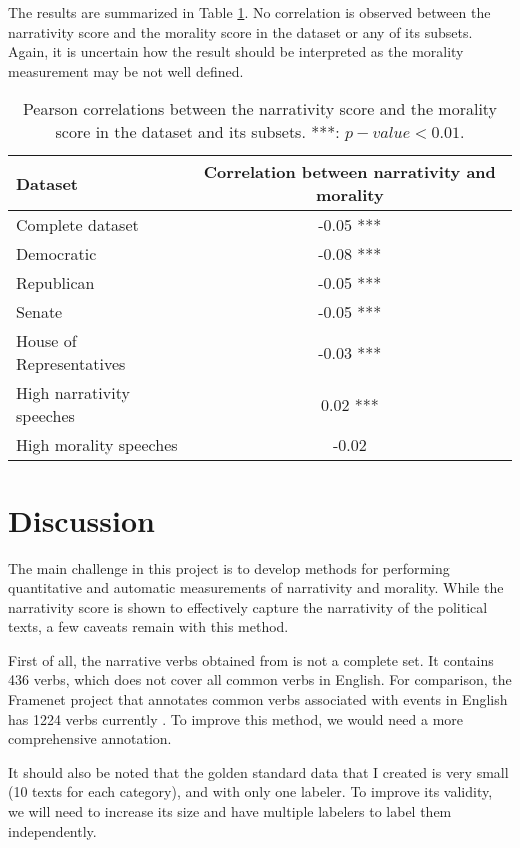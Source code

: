 \documentclass[a4paper]{article}
\begin{document}
The results are summarized in Table \ref{tab:correlations}. No correlation is observed between the narrativity score and the morality score in the dataset or any of its subsets. Again, it is uncertain how the result should be interpreted as the morality measurement may be not well defined.

\begin{table}
\centering
\begin{tabular}{l|c}
\toprule
Dataset & Correlation between narrativity and morality \\\hline
Complete dataset &  -0.05 ***\\
Democratic & -0.08 ***\\
Republican & -0.05 *** \\
Senate & -0.05 *** \\
House of Representatives & -0.03 ***\\
High narrativity speeches & 0.02 ***\\
High morality speeches & -0.02   \\
\bottomrule
\end{tabular}
\caption{\label{tab:correlations} Pearson correlations between the narrativity score and the morality score in the dataset and its subsets. ***: $p-value < 0.01$. }
\end{table}

\section*{Discussion}
The main challenge in this project is to develop methods for performing quantitative and automatic measurements of narrativity and morality. While the narrativity score is shown to effectively capture the narrativity of the political texts, a few caveats remain with this method.

First of all, the narrative verbs obtained from \cite{grisot2014cross} is not a complete set. It contains 436 verbs, which does not cover all common verbs in English. For comparison, the Framenet project that annotates common verbs associated with events in English has 1224 verbs currently \cite{framenetstatus}. To improve this method, we would need a more comprehensive annotation.

It should also be noted that the golden standard data that I created is very small (10 texts for each category), and with only one labeler. To improve its validity, we will need to increase its size and have multiple labelers to label them independently.
\end{document}
